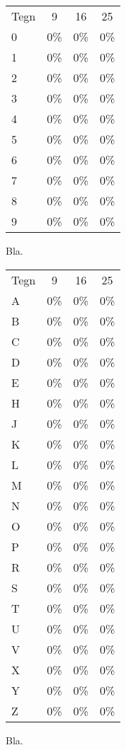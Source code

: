 \begin{figure}[htp]
\centering
\begin{tabular}{|l|c|c|c|}\hline
\rowcolor[gray]{0.9} \multicolumn{4}{|>{\columncolor[gray]{0.9}}c|}{\textbf{Middelvektor}} \\ \hline
Tegn & 9 & 16 & 25\\\hline
0 & 0\% & 0\% & 0\%\\\hline
1 & 0\%  & 0\% & 0\%\\\hline
2 & 0\% & 0\% & 0\%\\\hline
3 & 0\% & 0\% & 0\%\\\hline
4 & 0\% & 0\% & 0\%\\\hline
5 & 0\% & 0\% & 0\%\\\hline
6 & 0\% & 0\% & 0\%\\\hline
7 & 0\% & 0\% & 0\%\\\hline
8 & 0\% & 0\% & 0\%\\\hline
9 & 0\% & 0\% & 0\%\\\hline
\end{tabular}
\caption{Bla.}
\label{fig:test:middel_tal}
\end{figure}

\begin{figure}[htp]
\centering
\begin{tabular}{|l|c|c|c|}\hline
\rowcolor[gray]{0.9} \multicolumn{4}{|>{\columncolor[gray]{0.9}}c|}{\textbf{Middelvektor}} \\ \hline
Tegn & 9 & 16 & 25\\\hline
A & 0\% & 0\% & 0\%\\\hline
B & 0\% & 0\% & 0\%\\\hline
C & 0\% & 0\% & 0\%\\\hline
D & 0\% & 0\% & 0\%\\\hline
E & 0\% & 0\% & 0\%\\\hline
H & 0\% & 0\% & 0\%\\\hline
J & 0\% & 0\% & 0\%\\\hline
K & 0\% & 0\% & 0\%\\\hline 
L & 0\% & 0\% & 0\%\\\hline
M & 0\% & 0\% & 0\%\\\hline
N & 0\% & 0\% & 0\%\\\hline
O & 0\% & 0\% & 0\%\\\hline
P & 0\% & 0\% & 0\%\\\hline
R & 0\% & 0\% & 0\%\\\hline
S & 0\% & 0\% & 0\%\\\hline
T & 0\% & 0\% & 0\%\\\hline
U & 0\% & 0\% & 0\%\\\hline
V & 0\% & 0\% & 0\%\\\hline
X & 0\% & 0\% & 0\%\\\hline
Y & 0\% & 0\% & 0\%\\\hline
Z & 0\% & 0\% & 0\%\\\hline
\end{tabular}
\caption{Bla.}
\label{fig:test:middel_bogstav}
\end{figure}

